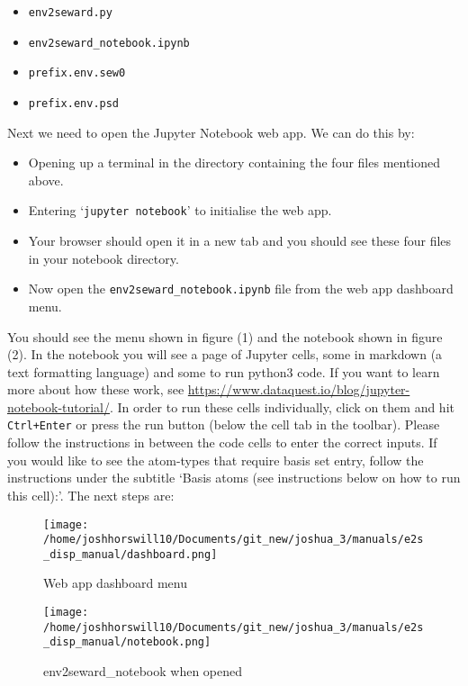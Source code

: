 \begin{itemize}
	\item \texttt{env2seward.py}
	\item \texttt{env2seward\_notebook.ipynb}
	\item \texttt{prefix.env.sew0}
	\item \texttt{prefix.env.psd}
\end{itemize}
Next we need to open the Jupyter Notebook web app. We can do this by:

\begin{itemize}
	\item Opening up a terminal in the directory containing the four files mentioned above.
	\item Entering `\texttt{jupyter notebook}' to initialise the web app.
	\item Your browser should open it in a new tab and you should see these four files in your notebook directory.
	\item Now open the \texttt{env2seward\_notebook.ipynb} file from the web app dashboard menu.
\end{itemize}

You should see the menu shown in figure (1) and the notebook shown in figure (2). In the notebook you will see a page of Jupyter cells, some in markdown (a text formatting language) and some to run python3 code. If you want to learn more about how these work, see \url{https://www.dataquest.io/blog/jupyter-notebook-tutorial/}. In order to run these cells individually, click on them and hit \texttt{Ctrl+Enter} or press the run button (below the cell tab in the toolbar). 
Please follow the instructions in between the code cells to enter the correct inputs. If you would like to see the atom-types that require basis set entry, follow the instructions under the subtitle `Basis atoms (see instructions below on how to run this cell):'. The next steps are:

\begin{figure}
	\centering
	\texttt{[image: /home/joshhorswill10/Documents/git\_new/joshua\_3/manuals/e2s\_disp\_manual/dashboard.png]}
	\caption{Web app dashboard menu}
	\label{fig:screenshot-from-2020-06-23-12-26-13}
\end{figure}

\begin{figure}
	\centering
	\texttt{[image: /home/joshhorswill10/Documents/git\_new/joshua\_3/manuals/e2s\_disp\_manual/notebook.png]}
	\caption{env2seward\_notebook when opened}
	\label{fig:screenshot-from-2020-06-23-12-26-25}
\end{figure}



